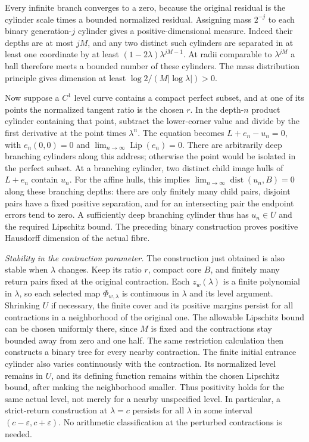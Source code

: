 Every infinite branch converges to a zero, because the original residual
is the cylinder scale times a bounded normalized residual.
Assigning mass $2^{-j}$ to each binary generation-$j$ cylinder gives a
positive-dimensional measure. Indeed their depths are at most $jM$,
and any two distinct such cylinders are separated in at least one
coordinate by at least $(1-2\lambda)\lambda^{jM-1}$.
At radii comparable to $\lambda^{jM}$ a ball therefore meets a bounded
number of these cylinders. The mass distribution principle gives
dimension at least $\log2/(M|\log\lambda|)>0$.

Now suppose a $C^1$ level curve contains a compact perfect subset, and
at one of its points the normalized tangent ratio is the chosen $r$.
In the depth-$n$ product cylinder containing that point, subtract the
lower-corner value and divide by the first derivative at the point times
$\lambda^n$. The equation becomes $L+e_n-u_n=0$, with $e_n(0,0)=0$ and
$\displaystyle\lim_{n\to\infty}\operatorname{Lip}(e_n)=0$.
There are arbitrarily deep branching cylinders along this address;
otherwise the point would be isolated in the perfect subset.
At a branching cylinder, two distinct child image hulls of $L+e_n$
contain $u_n$. For the affine hulls, this implies
$\displaystyle\lim_{n\to\infty}\operatorname{dist}(u_n,B)=0$ along these branching depths:
there are only finitely many child
pairs, disjoint pairs have a fixed positive separation, and for an
intersecting pair the endpoint errors tend to zero.
A sufficiently deep branching cylinder thus has $u_n\in U$ and the
required Lipschitz bound. The preceding binary construction proves
positive Hausdorff dimension of the actual fibre.

\par\medskip\noindent\emph{Stability in the contraction parameter.}
The construction just obtained is also stable when $\lambda$ changes.
Keep its ratio $r$, compact core $B$, and finitely many return pairs fixed
at the original contraction. Each $z_w(\lambda)$ is a finite polynomial
in $\lambda$, so each selected map $\Phi_{w,\lambda}$ is continuous in
$\lambda$ and its level argument. Shrinking $U$ if necessary, the finite
cover and its positive margins persist for all contractions in a
neighborhood of the original one. The allowable Lipschitz bound can be
chosen uniformly there, since $M$ is fixed and the contractions stay
bounded away from zero and one half. The same restriction calculation
then constructs a binary tree for every nearby contraction.
The finite initial entrance cylinder also varies continuously with the
contraction. Its normalized level remains in $U$, and its defining
function remains within the chosen Lipschitz bound, after making the
neighborhood smaller. Thus positivity holds for the same actual level,
not merely for a nearby unspecified level.
In particular, a strict-return construction at $\lambda=c$ persists
for all $\lambda$ in some interval $(c-\varepsilon,c+\varepsilon)$.
No arithmetic classification at the perturbed contractions is needed.
